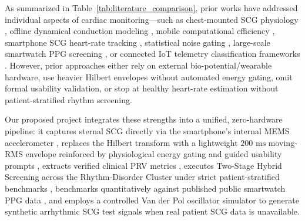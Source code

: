 As summarized in Table~\ref{tab:literature_comparison}, prior works have addressed individual aspects of cardiac monitoring---such as chest-mounted SCG physiology \cite{inan2015ballistocardiography}, offline dynamical conduction modeling \cite{quiroz2018cardiac}, mobile computational efficiency \cite{tsamis2017soft}, smartphone SCG heart-rate tracking \cite{tadi2016realtime}, statistical noise gating \cite{aliev2012monitoring}, large-scale smartwatch PPG screening \cite{perez2019large, lubitz2022detection}, or connected IoT telemetry classification frameworks \cite{pandian2026internet}. However, prior approaches either rely on external bio-potential/wearable hardware, use heavier Hilbert envelopes without automated energy gating, omit formal usability validation, or stop at healthy heart-rate estimation without patient-stratified rhythm screening.

Our proposed project integrates these strengths into a unified, zero-hardware pipeline: it captures sternal SCG directly via the smartphone's internal MEMS accelerometer \cite{inan2015ballistocardiography, tadi2016realtime}, replaces the Hilbert transform with a lightweight $200\text{ ms}$ moving-RMS envelope reinforced by physiological energy gating and guided usability prompts \cite{aliev2012monitoring, brooke1996sus}, extracts verified clinical PRV metrics \cite{taskforce1996heart}, executes Two-Stage Hybrid Screening across the Rhythm-Disorder Cluster under strict patient-stratified benchmarks \cite{dechazal2004automatic, pandian2026internet}, benchmarks quantitatively against published public smartwatch PPG data \cite{bent2020investigating, nelson2019accuracy}, and employs a controlled Van der Pol oscillator simulator \cite{vanderpol1928, quiroz2018cardiac} to generate synthetic arrhythmic SCG test signals when real patient SCG data is unavailable.